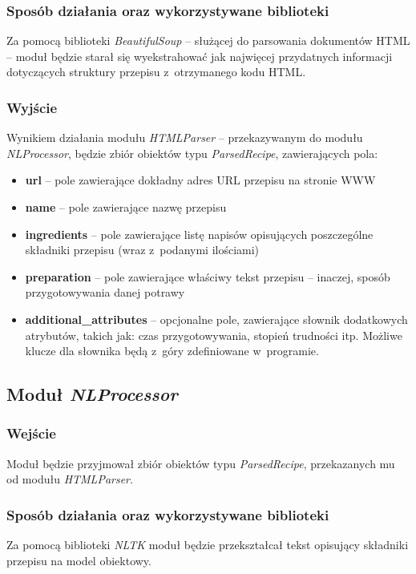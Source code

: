\documentclass[11pt,a4paper]{article}
\begin{document}
\subsubsection{Sposób działania oraz wykorzystywane biblioteki}
Za pomocą biblioteki \textit{BeautifulSoup} -- służącej do parsowania dokumentów HTML -- moduł będzie starał się wyekstrahować jak najwięcej przydatnych informacji dotyczących struktury przepisu z~otrzymanego kodu HTML.
\subsubsection{Wyjście}
Wynikiem działania modułu \textit{HTMLParser} -- przekazywanym do modułu \textit{NLProcessor}, będzie zbiór obiektów typu \textit{ParsedRecipe}, zawierających pola:
\begin{itemize}
  \item \textbf{url} -- pole zawierające dokładny adres URL przepisu na stronie WWW
  \item \textbf{name} -- pole zawierające nazwę przepisu
  \item \textbf{ingredients} -- pole zawierające listę napisów opisujących poszczególne składniki przepisu (wraz z~podanymi ilościami)
  \item \textbf{preparation} -- pole zawierające właściwy tekst przepisu -- inaczej, sposób przygotowywania danej potrawy
  \item \textbf{additional\_attributes} -- opcjonalne pole, zawierające słownik dodatkowych atrybutów, takich jak: czas przygotowywania, stopień trudności itp. Możliwe klucze dla słownika będą z~góry zdefiniowane w~programie.
\end{itemize}

\newpage
\subsection{Moduł \textit{NLProcessor}}
\subsubsection{Wejście}
Moduł będzie przyjmował zbiór obiektów typu \textit{ParsedRecipe}, przekazanych mu od modułu \textit{HTMLParser}.
\subsubsection{Sposób działania oraz wykorzystywane biblioteki}
Za pomocą biblioteki \textit{NLTK} moduł będzie przekształcał tekst opisujący składniki przepisu na model obiektowy.\\ 
\end{document}
